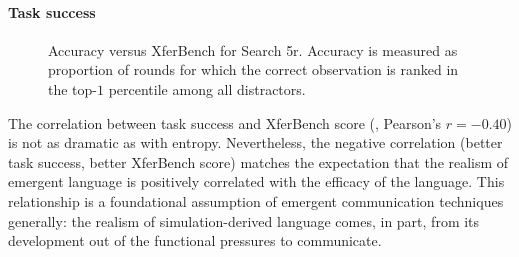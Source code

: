 \paragraph{Task success}
\begin{figure}
  \centering
  \caption{%
    Accuracy versus XferBench for Search 5r.
    Accuracy is measured as proportion of rounds for which the correct observation is ranked in the top-$1$ percentile among all distractors.}
  \unskip\label{hpo:fig:acc-vs-xb}
\end{figure}
The correlation between task success and XferBench score (, Pearson's $r=-0.40$) is not as dramatic as with entropy.
Nevertheless, the negative correlation (better task success, better XferBench score) matches the expectation that the realism of emergent language is positively correlated with the efficacy of the language.
This relationship is a foundational assumption of emergent communication techniques generally: the realism of simulation-derived language comes, in part, from its development out of the functional pressures to communicate.







